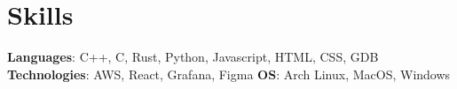 \documentclass[letterpaper,11pt]{article}
\newcommand{\resumeSubHeadingListStart}{\begin{itemize}[leftmargin=*]}
\newcommand{\resumeSubHeadingListEnd}{\end{itemize}}
\begin{document}
%



\section{Skills}
      \textbf{Languages}{: C++, C, Rust, Python, Javascript, HTML, CSS, GDB} \break
      \textbf{Technologies}{: AWS, React, Grafana, Figma} \break
      \textbf{OS}{: Arch Linux, MacOS, Windows}
\end{document}
